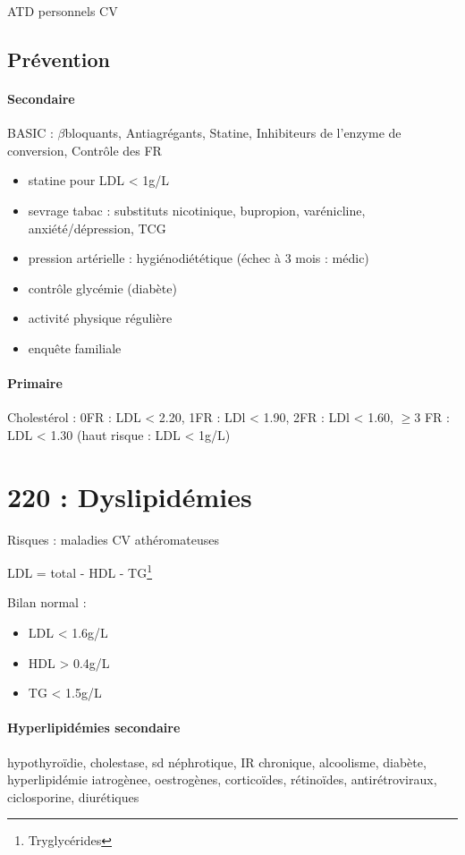 ATD personnels CV

\subsection{Prévention}
\paragraph{Secondaire}

BASIC : $\beta$bloquants, Antiagrégants, Statine, Inhibiteurs de l'enzyme de
conversion, Contrôle des FR

\begin{itemize}
  \item statine pour LDL < 1g/L
\item sevrage tabac : substituts nicotinique, {bupropion, varénicline},
  anxiété/dépression, TCG
  \item pression artérielle : hygiénodiététique (échec à 3 mois : médic)
  \item contrôle glycémie (diabète)
  \item activité physique régulière
  \item enquête familiale
\end{itemize}

\paragraph{Primaire}
Cholestérol : 0FR : LDL < 2.20, 1FR : LDl < 1.90, 2FR : LDl < 1.60, $\ge 3$ FR
: LDL < 1.30 (haut risque : LDL < 1g/L)







\section{220 : Dyslipidémies}%
\label{sec:220_dyslipidemies}

Risques : maladies CV athéromateuses

LDL = total - HDL - TG\footnote{Tryglycérides}

Bilan normal : \begin{itemize}
  \item LDL  < 1.6g/L
  \item HDL  > 0.4g/L
  \item TG  < 1.5g/L
\end{itemize}

\paragraph{Hyperlipidémies secondaire } hypothyroïdie, cholestase, sd néphrotique, IR chronique, alcoolisme,
diabète, hyperlipidémie iatrogènee, oestrogènes, corticoïdes, rétinoïdes,
antirétroviraux, ciclosporine, diurétiques

